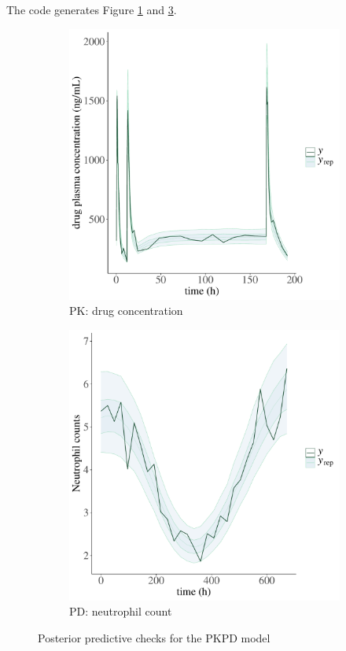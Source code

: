 The code generates Figure \ref{fig:neutro_ppc_1} and \ref{fig:neutro_ppc_2}.
\begin{figure}
  \begin{subfigure}[b]{0.45\textwidth}
    \includegraphics[width=\textwidth]{../figures/neutrophil_ppc_pk.pdf}
    \caption{PK: drug concentration}
    \label{fig:neutro_ppc_1}
  \end{subfigure}
  \qquad
  \begin{subfigure}[b]{0.45\textwidth}
    \includegraphics[width=\textwidth]{../figures/neutrophil_ppc_pd.pdf}
    \caption{PD: neutrophil count}
    \label{fig:neutro_ppc_2}
  \end{subfigure}
  \caption{Posterior predictive checks for the PKPD model}
\end{figure}
